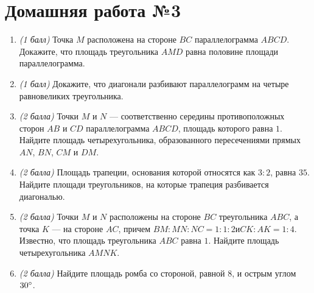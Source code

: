 \documentclass[12pt, a4paper]{article}
\begin{document}
	
	\section*{Домашняя работа №3}
	\begin{enumerate}
		\item \textit{(1 балл)} Точка $M$ расположена на стороне $BC$ параллелограмма $ABCD$. Докажите, что площадь треугольника $AMD$ равна половине площади параллелограмма.
		\item \textit{(1 балл)} Докажите, что диагонали разбивают параллелограмм на четыре равновеликих треугольника.
		\item \textit{(2 балла)} Точки $M$ и $N$ — соответственно середины противоположных сторон $AB$ и $CD$ параллелограмма $ABCD$, площадь которого равна $1$. Найдите площадь четырехугольника, образованного пересечениями прямых $AN$, $BN$, $CM$ и $DM$.
		\item \textit{(2 балла)} Площадь трапеции, основания которой относятся как $3 : 2$, равна $35$. Найдите площади треугольников, на которые трапеция разбивается диагональю.
		\item \textit{(2 балла)} Точки $M$ и $N$ расположены на стороне $BC$ треугольника $ABC$, а точка $K$ — на стороне $AC$, причем $BM : MN : NC = 1 : 1 : 2 и CK : AK = 1 : 4$. Известно, что площадь треугольника $ABC$ равна $1$. Найдите площадь четырехугольника $AMNK$.

		\item \textit{(2 балла)} Найдите площадь ромба со стороной, равной $8$, и острым углом $30\degree$.
	\end{enumerate}
\end{document}
